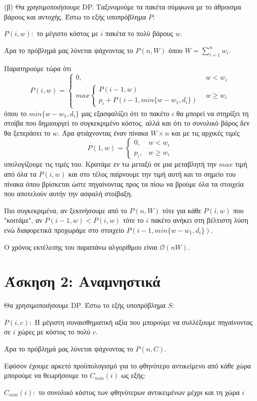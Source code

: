 \documentclass[a4paper,11pt]{article}
\begin{document}
(β) Θα χρησιμοποιήσουμε DP. Ταξινομούμε τα πακέτα σύμφωνα με το άθροισμα βάρους και αντοχής. Έστω το εξής υποπρόβλημα $P$:
\begin{center}
  $P(i,w):$ το μέγιστο κόστος με $i$ πακέτα το πολύ βάρους $w$.
\end{center}
Άρα το πρόβλημά μας λύνεται ψάχνοντας το $P(n,W)$ όπου $W = \sum_{i=1}^nw_i$.

Παρατηρούμε τώρα ότι
$$P(i,w) =
  \begin{cases}
    0, & \text{$w < w_i$}\\
    max
    \begin{cases}
      P(i-1,w)\\
      p_i + P(i-1,min\{w-w_1, d_i\})
    \end{cases} & \text{$w \geq w_i$}
  \end{cases}$$
όπου το $min\{w-w_1, d_i\}$ μας εξασφαλίζει ότι το πακέτο $i$ θα μπορεί να στηρίξει τη στοίβα που δημιουργεί το συγκεκριμένο κόστος, αλλά και ότι το συνολικό βάρος δεν θα ξεπεράσει το $w$. Άρα φτιάχνοντας έναν πίνακα $W \times n$ και με τις αρχικές τιμές
$$P(1,w) =
  \begin{cases}
    0, & \text{$w < w_i$}\\
    p_i, & \text{$w \geq w_i$}
  \end{cases}$$
υπολογίζουμε τις τιμές του. Κρατάμε εν τω μεταξύ σε μια μεταβλητή την $max$ τιμή από όλα τα $P(i,w)$ και στο τέλος παίρνουμε την τιμή αυτή και το σημείο του πίνακα όπου βρίσκεται ώστε πηγαίνοντας προς τα πίσω να βρούμε όλα τα στοιχεία που αποτελούν αυτήν την ασφαλή στοίβαξη.

Πιο συγκεκριμένα, αν ξεκινήσουμε από το $P(n,W)$ τότε για κάθε $P(i,w)$ που "κοιτάμε", αν $P(i-1,w) < P(i,w)$ τότε το $i$ πακέτο ανήκει στη βέλτιστη λύση ενώ διαφορετικά προχωράμε στο στοιχείο $P(i-1,min\{w-w_1,d_i\})$.

Ο χρόνος εκτέλεσης του παραπάνω αλγορίθμου είναι $\mathcal{O}(nW)$.

\section*{Άσκηση 2: Αναμνηστικά}
Θα χρησιμοποιήσουμε DP. Έστω το εξής υποπρόβλημα $S$:
\begin{center}
  $P(i,c):$ Η μέγιστη συναισθηματική αξία που μπορούμε να συλλέξουμε πηγαίνοντας σε $i$ χώρες με κόστος το πολύ $c$.
\end{center}
Άρα το πρόβλημά μας λύνεται ψάχνοντας το $P(n,C)$.

Εφόσον έχουμε αρκετό προϋπολογισμό για το φθηνότερο αντικείμενο από κάθε χώρα μπορούμε να θεωρήσουμε το $C_{min}(i)$ ως εξής:
\begin{center}
  $C_{min}(i):$ το συνολικό κόστος των φθηνότερων αντικειμένων μέχρι και τη χώρα $i$
\end{center}
\end{document}
